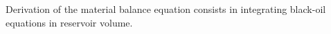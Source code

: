 \documentclass[authoryear,preprint,review,11pt]{elsarticle}
\begin{document}
Derivation of the material balance equation consists in integrating black-oil equations in reservoir volume.


\end{document}
